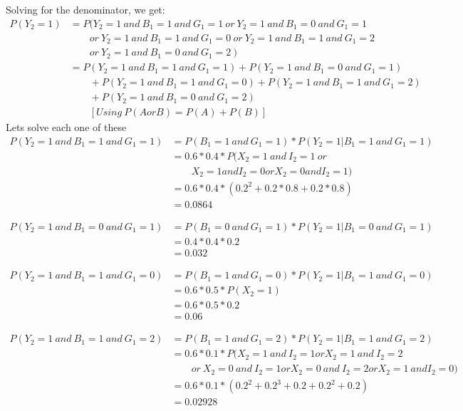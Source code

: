 \documentclass[12pt]{article}
\begin{document}
Solving for the denominator, we get:
\begin{align}
P(Y_2 = 1) & = P(Y_2 = 1\ and\ B_1 = 1\ and\ G_1 = 1\ or\ Y_2 = 1\ and\ B_1 = 0\ and\ G_1 = 1 \nonumber \\
& \qquad or\ Y_2 = 1\ and\ B_1 = 1\ and\ G_1 = 0\ or\ Y_2 = 1\ and\ B_1 = 1\ and\ G_1 = 2 \nonumber \\
& \qquad or\ Y_2 = 1\ and\ B_1 = 0\ and\ G_1 = 2\ ) \nonumber \\
& = P(Y_2 = 1\ and\ B_1 = 1\ and\ G_1 = 1) + P(Y_2 = 1\ and\ B_1 = 0\ and\ G_1 = 1) \nonumber \\
& \qquad + P(Y_2 = 1\ and\ B_1 = 1\ and\ G_1 = 0) + P(Y_2 = 1\ and\ B_1 = 1\ and\ G_1 = 2)  \nonumber \\
& \qquad + P(Y_2 = 1\ and\ B_1 = 0\ and\ G_1 = 2) \nonumber \\
& \qquad [Using\ P(A or B) = P(A) + P(B)] \nonumber
\end{align}
Lets solve each one of these 
\begin{align}
P(Y_2 = 1\ and\ B_1 = 1\ and\ G_1 = 1) & = P(B_1 = 1\ and\ G_1 = 1) * P(Y_2 = 1 | B_1 = 1\ and\ G_1 = 1) \nonumber\\
& = 0.6 * 0.4 * P( X_2 = 1\ and\ I_2 = 1\ or \nonumber \\
& \qquad X_2 = 1 and I_2 = 0 or X_2 = 0 and I_2 = 1) \nonumber \\
& = 0.6 * 0.4 * (0.2^2 + 0.2*0.8 + 0.2*0.8) \nonumber \\
& = 0.0864 \nonumber
\end{align}

\begin{align}
P(Y_2 = 1\ and\ B_1 = 0\ and\ G_1 = 1) & = P(B_1 = 0\ and\ G_1 = 1) * P(Y_2 = 1 | B_1 = 0\ and\ G_1 = 1) \nonumber \\
& = 0.4 * 0.4 * 0.2 \nonumber\\
& = 0.032 \nonumber
\end{align} 

\begin{align}
P(Y_2 = 1\ and\ B_1 = 1\ and\ G_1 = 0) & = P(B_1 = 1\ and\ G_1 = 0) * P(Y_2 = 1 | B_1 = 1\ and\ G_1 = 0) \nonumber \\
& = 0.6 * 0.5 * P(X_2 = 1) \nonumber \\
& = 0.6 * 0.5 * 0.2 \nonumber\\
& = 0.06 \nonumber
\end{align}

\begin{align}
P(Y_2 = 1\ and\ B_1 = 1\ and\ G_1 = 2) & = P(B_1 = 1\ and\ G_1 = 2) * P(Y_2 = 1 | B_1 = 1\ and\ G_1 = 2) \nonumber \\
& = 0.6 * 0.1 * P(X_2 = 1\ and\ I_2 = 1 or X_2 = 1\ and \ I_2 = 2 \nonumber \\
& \qquad or\ X_2 = 0\ and\ I_2 = 1 or X_2 = 0\ and \ I_2 = 2 or X_2 = 1\ and I_2 =0) \nonumber \\
& = 0.6 * 0.1 * (0.2^2 + 0.2^3 + 0.2 + 0.2^2 + 0.2) \nonumber\\
& = 0.02928 \nonumber
\end{align}
\end{document}
